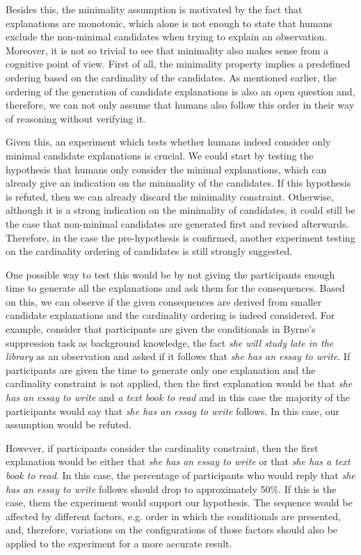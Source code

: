 Besides this, the minimality assumption is motivated by the fact that explanations are monotonic, which alone is not enough to state that humans exclude the non-minimal candidates when trying to explain an observation. Moreover, it is not so trivial to see that minimality also makes sense from a cognitive point of view. First of all, the minimality property implies a predefined ordering based on the cardinality of the candidates. As mentioned earlier, the ordering of the generation of candidate explanations is also an open question and, therefore, we can not only assume that humans also follow this order in their way of reasoning without verifying it. 
 
Given this, an experiment which tests whether humans indeed consider only minimal candidate explanations is crucial. We could start by testing the hypothesis that humans only consider the minimal explanations, which can already give an indication on the minimality of the candidates. If this hypothesis is refuted, then we can already discard the minimality constraint. Otherwise, although it is a strong indication on the minimality of candidates, it could still be the case that non-minimal candidates are generated first and revised afterwards. Therefore, in the case the pre-hypothesis is confirmed, another experiment testing on the cardinality ordering of candidates is still strongly suggested.

One possible way to test this would be by not giving the participants enough time to generate all the explanations and ask them for the consequences. Based on this, we can observe if the given consequences are derived from smaller candidate explanations and the cardinality ordering is indeed considered. For example, consider that participants are given the conditionals in Byrne's suppression task  as background knowledge, the fact \textit{she will study late in the library} as an observation and asked if it follows that \textit{she has an essay to write}. If participants are given the time to generate only one explanation and the cardinality constraint is not applied, then the first explanation would be that \textit{she has an essay to write} and \textit{a text book to read} and in this case the majority of the participants would say that \textit{she has an essay to write} follows. In this case, our assumption would be refuted.

However, if participants consider the cardinality constraint, then the first explanation would be either that \textit{she has an essay to write} or that \textit{she has a text book to read}. In this case, the percentage of participants who would reply that \textit{she has an essay to write} follows should drop to approximately 50\%. If this is the case, them the experiment would support our hypothesis. The sequence would be affected by different factors, e.g. order in which the conditionals are presented, and, therefore, variations on the configurations of those factors should also be applied to the experiment for a more accurate result.
 
